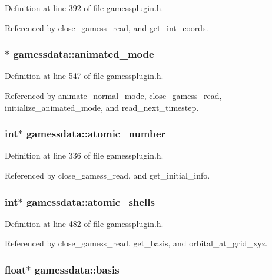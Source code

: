 Definition at line 392 of file gamessplugin.h.

Referenced by close\_\-gamess\_\-read, and get\_\-int\_\-coords.
\subsubsection{$\ast$ gamessdata::animated\_\-mode}\label{structgamessdata_m76}




Definition at line 547 of file gamessplugin.h.

Referenced by animate\_\-normal\_\-mode, close\_\-gamess\_\-read, initialize\_\-animated\_\-mode, and read\_\-next\_\-timestep.
\subsubsection{\setlength{\rightskip}{0pt plus 5cm}int$\ast$ gamessdata::atomic\_\-number}\label{structgamessdata_m20}




Definition at line 336 of file gamessplugin.h.

Referenced by close\_\-gamess\_\-read, and get\_\-initial\_\-info.
\subsubsection{\setlength{\rightskip}{0pt plus 5cm}int$\ast$ gamessdata::atomic\_\-shells}\label{structgamessdata_m64}




Definition at line 482 of file gamessplugin.h.

Referenced by close\_\-gamess\_\-read, get\_\-basis, and orbital\_\-at\_\-grid\_\-xyz.
\subsubsection{\setlength{\rightskip}{0pt plus 5cm}float$\ast$ gamessdata::basis}\label{structgamessdata_m61}




